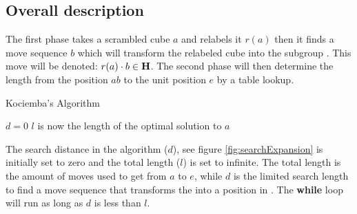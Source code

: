 \subsection{Overall description}
\label{sub:overallDescription}
The first phase takes a scrambled cube $a$ and relabels it $r(a)$ then it finds a move sequence $b$ which will transform the relabeled cube into the subgroup . This move will be denoted: $r(a)\cdot{}b \in \textbf{H}$. The second phase will then determine the length from the position $ab$ to the unit position $e$ by a table lookup. 


\begin{algorithm}[!htb]                     
\caption{Kociemba's Algorithm \cite{rokicki09}}          
\label{alg:kociemba}        
\begin{algorithmic}[1]
\STATE $d=0$
			\ENDIF
		\ENDIF
	\ENDFOR
\ENDWHILE
\STATE $l$ is now the length of the optimal solution to $a$
\end{algorithmic}
\end{algorithm}

The search distance in the algorithm ($d$), see figure \ref{fig:searchExpansion} is initially set to zero and the total length ($l$) is set to infinite. The total length is the amount of moves used to get from $a$ to $e$, while $d$ is the limited search length to find a move sequence that transforms the \rubik{} into a position in . 
The \textbf{while} loop will run as long as $d$ is less than $l$.

